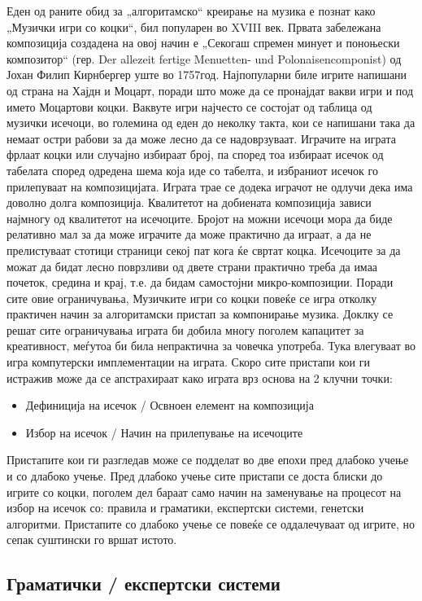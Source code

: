 Еден од раните обид за „алгоритамско“ креирање на музика е познат како „Музички игри со коцки“, бил популарен во XVIII век. Првата забележана композиција создадена на овој начин е „Секогаш спремен минует и поноњески композитор“ (гер. Der allezeit fertige Menuetten- und Polonaisencomponist) од Јохан Филип Кирнбергер уште во 1757год. Најпопуларни биле игрите напишани од страна на Хајдн и Моцарт, поради што може да се пронајдат вакви игри и под името Моцартови коцки. Ваквуте игри најчесто се состојат од таблица од музички исечоци, во големина од еден до неколку такта, кои се напишани така да немаат остри рабови за да може лесно да се надоврзуваат. Играчите на играта фрлаат коцки или случајно избираат број, па според тоа избираат исечок од табелата според одредена шема која иде со табелта, и избраниот исечок го прилепуваат на композицијата. Играта трае се додека играчот не одлучи дека има доволно долга композиција. Квалитетот на добиената композиција зависи најмногу од квалитетот на исечоците. Бројот на можни исечоци мора да биде релативно мал за да може играчите да може практично да играат, а да не прелистуваат стотици страници секој пат кога ќе свртат коцка. Исечоците за да можат да бидат лесно поврзливи од двете страни практично треба да имаа почеток, средина и крај, т.е. да бидам самостојни микро-композиции. Поради сите овие ограничувања, Музичките игри со коцки повеќе се игра отколку практичен начин за алгоритамски пристап за компонирање музика. Доклку се решат сите ограничувања играта би добила многу поголем капацитет за креативност, меѓутоа би била непрактична за човечка употреба. Тука влегуваат во игра компутерски имплементации на играта. Скоро сите пристапи кои ги истражив може да се апстрахираат како играта врз основа на 2 клучни точки:
\begin{itemize}
    \item Дефиниција на исечок / Освноен елемент на композиција 
    \item Избор на исечок / Начин на прилепување на исечоците
\end{itemize}
Пристапите кои ги разгледав може се подделат во две епохи пред длабоко учење и со длабоко учење. Пред длабоко учење сите пристапи се доста блиски до игрите со коцки, поголем дел бараат само начин на заменување на процесот на избор на исечок со: правила и граматики, експертски системи, генетски алгоритми. Пристапите со длабоко учење се повеќе се оддалечуваат од игрите, но сепак суштински го вршат истото. 

\subsection{Граматички / експертски системи} 


